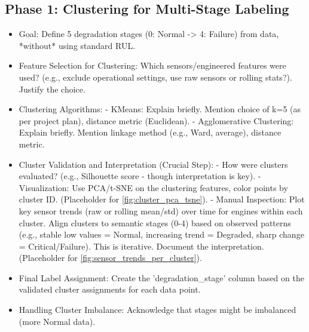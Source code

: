 \subsection{Phase 1: Clustering for Multi-Stage Labeling}
\label{subsec:clustering}
\begin{itemize}
    \item Goal: Define 5 degradation stages (0: Normal -> 4: Failure) from data, *without* using standard RUL.
    \item Feature Selection for Clustering: Which sensors/engineered features were used? (e.g., exclude operational settings, use raw sensors or rolling stats?). Justify the choice.
    \item Clustering Algorithms:
        - KMeans: Explain briefly. Mention choice of k=5 (as per project plan), distance metric (Euclidean).
        - Agglomerative Clustering: Explain briefly. Mention linkage method (e.g., Ward, average), distance metric.
    \item Cluster Validation and Interpretation (Crucial Step):
        - How were clusters evaluated? (e.g., Silhouette score - though interpretation is key).
        - Visualization: Use PCA/t-SNE on the clustering features, color points by cluster ID. (Placeholder for \cref{fig:cluster_pca_tsne}).
        - Manual Inspection: Plot key sensor trends (raw or rolling mean/std) over time for engines within each cluster. Align clusters to semantic stages (0-4) based on observed patterns (e.g., stable low values = Normal, increasing trend = Degraded, sharp change = Critical/Failure). This is iterative. Document the interpretation. (Placeholder for \cref{fig:sensor_trends_per_cluster}).
    \item Final Label Assignment: Create the 'degradation_stage' column based on the validated cluster assignments for each data point.
    \item Handling Cluster Imbalance: Acknowledge that stages might be imbalanced (more Normal data).
\end{itemize}


